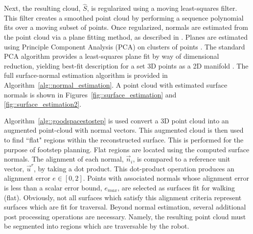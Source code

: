 			Next, the resulting cloud, $\hat{S}$, is regularized using a moving least-squares filter. This filter creates a smoothed point cloud by performing a sequence polynomial fits over a moving subset of points. Once regularized, normals are estimated from the point cloud via a plane fitting method, as described in \cite{Mitra2003}. Planes are estimated using Principle Component Analysis (PCA) on clusters of points \cite{Castillo2013}. The standard PCA algorithm provides a least-squares plane fit by way of dimensional reduction, yielding best-fit description for a set 3D points as a 2D manifold \cite{Pearson1901}. The full surface-normal estimation algorithm is provided in Algorithm~\ref{alg::normal_estimation}. A point cloud with estimated surface normals is shown in Figures~\ref{fig::surface_estimation} and \ref{fig::surface_estimation2}.

			Algorithm~\ref{alg::goodspacestostep} is used convert a 3D point cloud into an augmented point-cloud with normal vectors. This augmented cloud is then used to find ``flat" regions within the reconstructed surface. This is performed for the purpose of footstep planning. Flat regions are located using the computed surface normals. The alignment of each \Ith normal, $\vec{n}_{i}$, is compared to a reference unit vector, $\vec{u}^{r}$, by taking a dot product. This dot-product operation produces an alignment error $e\in[0,2]$. Points with associated normals whose alignment error is less than a scalar error bound, $e_{max}$, are selected as surfaces fit for walking (\IE flat). Obviously, not all surfaces which satisfy this alignment criteria represent surfaces which are fit for traversal. Beyond normal estimation, several additional post processing operations are necessary. Namely, the resulting point cloud must be segmented into regions which are traversable by the robot.

